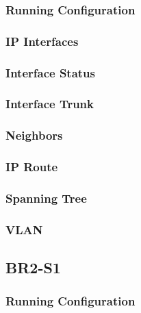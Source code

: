 \subsubsection{Running Configuration}


\subsubsection{IP Interfaces}


\subsubsection{Interface Status}


\subsubsection{Interface Trunk}


\subsubsection{Neighbors}


\subsubsection{IP Route}


\subsubsection{Spanning Tree}


\subsubsection{VLAN}





\subsection{BR2-S1}
\subsubsection{Running Configuration}


